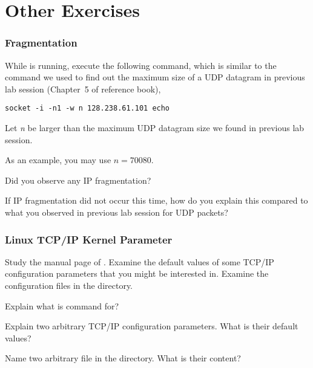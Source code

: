 \documentclass{../UTNetLab}
\begin{document}
\part{Other Exercises}
\section{Fragmentation}
While  is running, execute the following command, which is similar to the command we used to find out the maximum size of a UDP datagram in previous lab session (Chapter~5 of reference book),
\begin{lstlisting}[emph={n, h1,netlab}]
socket -i -n1 -w n 128.238.61.101 echo
    \end{lstlisting}
Let \textit{n} be larger than the maximum UDP datagram size we found in previous lab session.

As an example, you may use $n = 70080$.

\begin{report}
    \item Did you observe any IP fragmentation?

    \item If IP fragmentation did not occur this time, how do you explain this compared to what you observed in previous lab session for UDP packets?
\end{report}

\section{Linux TCP/IP Kernel Parameter}
Study the manual page of .
Examine the default values of some TCP/IP configuration parameters that you might be interested in.
Examine the configuration files in the  directory.

\begin{report}
    \item Explain what is  command for?

    \item Explain two arbitrary TCP/IP configuration parameters.
    What is their default values?

    \item Name two arbitrary file in the  directory.
    What is their content?
\end{report}
\end{document}
